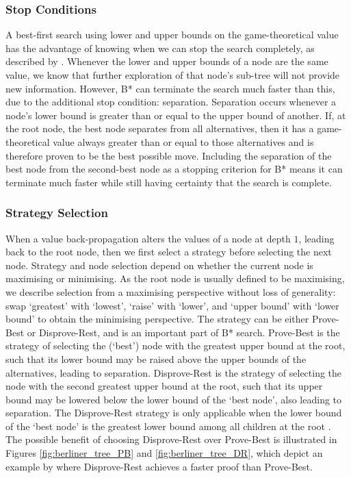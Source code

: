 \subsubsection{Stop Conditions}
A best-first search using lower and upper bounds on the game-theoretical value has the advantage of knowing when we can stop the search completely, as described by . Whenever the lower and upper bounds of a node are the same value, we know that further exploration of that node’s sub-tree will not provide new information. However, B* can terminate the search much faster than this, due to the additional stop condition: separation. Separation occurs whenever a node's lower bound is greater than or equal to the upper bound of another. If, at the root node, the best node separates from all alternatives, then it has a game-theoretical value always greater than or equal to those alternatives and is therefore proven to be the best possible move. Including the separation of the best node from the second-best node as a stopping criterion for B* means it can terminate much faster while still having certainty that the search is complete.

\subsubsection{Strategy Selection}
When a value back-propagation alters the values of a node at depth $1$, leading back to the root node, then we first select a strategy before selecting the next node. Strategy and node selection depend on whether the current node is maximising or minimising. As the root node is usually defined to be maximising, we describe selection from a maximising perspective without loss of generality: swap `greatest’ with `lowest’, `raise’ with `lower’, and `upper bound’ with `lower bound’ to obtain the minimising perspective. The strategy can be either Prove-Best or Disprove-Rest, and is an important part of B* search. Prove-Best is the strategy of selecting the (`best’) node with the greatest upper bound at the root, such that its lower bound may be raised above the upper bounds of the alternatives, leading to separation. Disprove-Rest is the strategy of selecting the node with the second greatest upper bound at the root, such that its upper bound may be lowered below the lower bound of the `best node’, also leading to separation. The Disprove-Rest strategy is only applicable when the lower bound of the `best node' is the greatest lower bound among all children at the root \cite{Berliner1979}. 
The possible benefit of choosing Disprove-Rest over Prove-Best is illustrated in Figures \ref{fig:berliner_tree_PB} and \ref{fig:berliner_tree_DR}, which depict an example by  where Disprove-Rest achieves a faster proof than Prove-Best.

